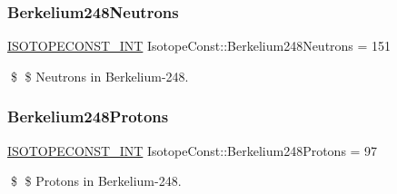 \subsubsection{\texorpdfstring{Berkelium248\+Neutrons}{Berkelium248Neutrons}}
{\footnotesize\ttfamily \mbox{\hyperlink{group___isotope_const-_macros_ga5f18360b3e99483a35c32d789e62621c}{I\+S\+O\+T\+O\+P\+E\+C\+O\+N\+S\+T\+\_\+\+I\+NT}} Isotope\+Const\+::\+Berkelium248\+Neutrons = 151}

\$ \$ Neutrons in Berkelium-\/248. \mbox{\label{group___isotope_const-_berkelium-_bk248_gabd9f3c2f28e0f9512594183680e61d1d}} 
\subsubsection{\texorpdfstring{Berkelium248\+Protons}{Berkelium248Protons}}
{\footnotesize\ttfamily \mbox{\hyperlink{group___isotope_const-_macros_ga5f18360b3e99483a35c32d789e62621c}{I\+S\+O\+T\+O\+P\+E\+C\+O\+N\+S\+T\+\_\+\+I\+NT}} Isotope\+Const\+::\+Berkelium248\+Protons = 97}

\$ \$ Protons in Berkelium-\/248. 